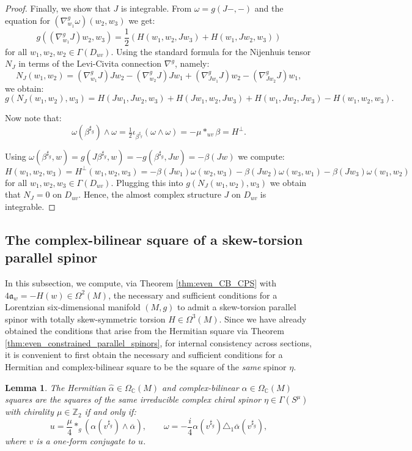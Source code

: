 \documentclass[10pt,a4paper,twoside,reqno]{amsart}
\theoremstyle{plain}
\newtheorem{lemma}[thm]{Lemma}
\theoremstyle{definition}
\theoremstyle{remark}
\def\Z{\mathbb{Z}}
\def\C{\mathbb{C}}
\def\fra{\mathfrak{a}}
\begin{document}
\begin{proof}
    Finally, we show that $J$ is integrable. From $\omega=g(J-,-)$ and the equation for $(\nabla^g_{w_1}\omega)(w_2,w_3)$ we get: $$g((\nabla^g_{w_1}J)w_2,w_3)=\frac{1}{2}(H(w_1,w_2,Jw_3)+H(w_1,Jw_2,w_3))$$ for all $w_1,w_2,w_2\in\Gamma(D_{uv})$. Using the standard formula for the Nijenhuis tensor $N_J$ in terms of the Levi-Civita connection $\nabla^g$, namely: $$N_J(w_1,w_2)=(\nabla^g_{w_1}J)Jw_2-(\nabla^g_{w_2}J)Jw_1+(\nabla^g_{Jw_1}J)w_2-(\nabla^g_{Jw_2}J)w_1,$$ we obtain: $$g(N_J(w_1,w_2),w_3)=H(Jw_1,Jw_2,w_3)+H(Jw_1,w_2,Jw_3)+H(w_1,Jw_2,Jw_3)-H(w_1,w_2,w_3).$$
    
    Now note that: $$\omega(\beta^{\sharp_g})\wedge\omega=\tfrac{1}{2}\iota_{\beta^{\sharp_g}}(\omega\wedge\omega)=-\mu*_{uv}\beta=H^\perp.$$
    
    Using $\omega(\beta^{\sharp_g},w)=g(J\beta^{\sharp_g},w)=-g(\beta^{\sharp_g},Jw)=-\beta(Jw)$ we compute: $$H(w_1,w_2,w_3)=H^\perp(w_1,w_2,w_3)=-\beta(Jw_1)\omega(w_2,w_3)-\beta(Jw_2)\omega(w_3,w_1)-\beta(Jw_3)\omega(w_1,w_2)$$ for all $w_1,w_2,w_3\in\Gamma(D_{uv})$. Plugging this into $g(N_J(w_1,w_2),w_3)$ we obtain that $N_J=0$ on $D_{uv}$. Hence, the almost complex structure $J$ on $D_{uv}$ is integrable.
\end{proof}


\subsection{The complex-bilinear square of a skew-torsion parallel spinor}


In this subsection, we compute, via Theorem \ref{thm:even_CB_CPS} with $4\fra_w=-H(w)\in\Omega^2(M)$, the necessary and sufficient conditions for a Lorentzian six-dimensional manifold $(M,g)$ to admit a skew-torsion parallel spinor with totally skew-symmetric torsion $H\in \Omega^3(M)$. Since we have already obtained the conditions that arise from the Hermitian square via Theorem \ref{thm:even_constrained_parallel_spinors}, for internal consistency across sections, it is convenient to first obtain the necessary and sufficient conditions for a Hermitian and complex-bilinear square to be the square of the \emph{same} spinor $\eta$.

\begin{lemma}
\label{lemma:squares_same_spinor_(5,1)}
The Hermitian $\widehat{\alpha}\in\Omega_\C(M)$ and complex-bilinear $\alpha\in\Omega_\C(M)$ squares are the squares of the same irreducible complex chiral spinor $\eta\in\Gamma(S^\mu)$ with chirality $\mu\in\Z_2$ if and only if: $$u=\frac{\mu}{4}*_g(\alpha(v^{\sharp_g})\wedge\overline{\alpha}),\qquad\omega=-\frac{i}{4}\alpha(v^{\sharp_g})\triangle_1\overline{\alpha}(v^{\sharp_g}),$$ where $v$ is a one-form conjugate to $u$.
\end{lemma}
\end{document}
